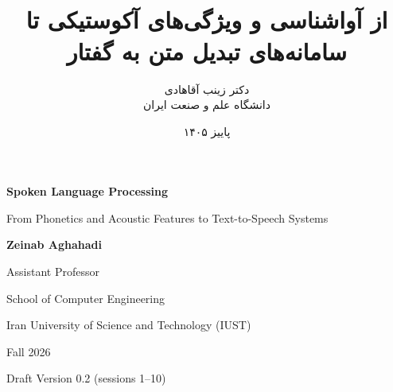 \documentclass[12pt,a4paper]{book}
\title{{\titlefont\Huge \course}\\[0.5em]
{\Large از آواشناسی و ویژگی‌های آکوستیکی تا سامانه‌های تبدیل متن به گفتار}}
\author{دکتر زینب آقاهادی\\[0.4em]
دانشگاه علم و صنعت ایران}
\date{پاییز ۱۴۰۵}
\begin{document}
\raggedbottom
\frontmatter
\maketitle

\begingroup
\thispagestyle{empty}
\begin{latin}
\centering
\vspace*{0.16\textheight}
{\Huge\bfseries Spoken Language Processing\par}
\vspace{3em}
{\Large From Phonetics and Acoustic Features to Text-to-Speech Systems\par}
\vfill
{\Large\bfseries Zeinab Aghahadi\par}
\vspace{1.2em}
{\large Assistant Professor\par}
{\large School of Computer Engineering\par}
{\large Iran University of Science and Technology (IUST)\par}
\vfill
{\large Fall 2026\par}
\vspace{0.5em}
{\large Draft Version 0.2 (sessions 1--10)\par}
\end{latin}
\clearpage
\endgroup



\tableofcontents

\mainmatter











\end{document}
